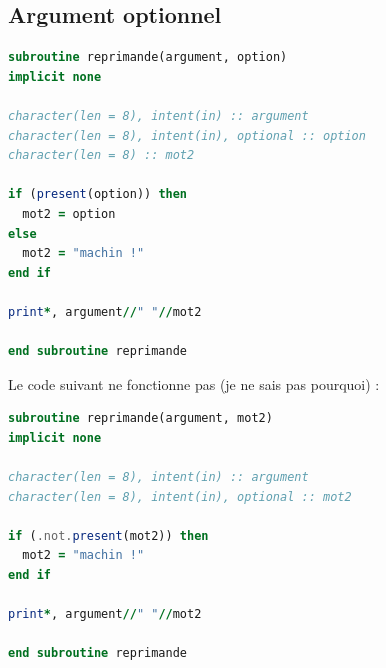 \documentclass[a4paper,twoside]{article}
\begin{document}
\subsection{Argument optionnel}
\begin{lstlisting}[language=Fortran]
subroutine reprimande(argument, option)
implicit none

character(len = 8), intent(in) :: argument
character(len = 8), intent(in), optional :: option
character(len = 8) :: mot2

if (present(option)) then
  mot2 = option
else
  mot2 = "machin !"
end if

print*, argument//" "//mot2

end subroutine reprimande
\end{lstlisting}

\begin{attention}
Le code suivant ne fonctionne pas (je ne sais pas pourquoi) : 
\begin{lstlisting}[language=Fortran]
subroutine reprimande(argument, mot2)
implicit none

character(len = 8), intent(in) :: argument
character(len = 8), intent(in), optional :: mot2

if (.not.present(mot2)) then
  mot2 = "machin !"
end if

print*, argument//" "//mot2

end subroutine reprimande
\end{lstlisting}
\end{attention}
\end{document}
